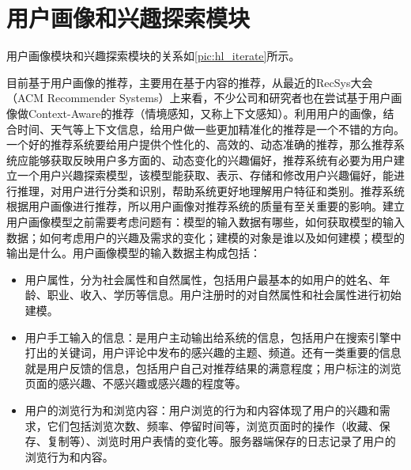   \section{用户画像和兴趣探索模块}
  用户画像模块和兴趣探索模块的关系如\autoref{pic:hl_iterate}所示。
  \begin{figure}
    \centering
      \label{pic:hl_iterate}
  \end{figure}
  目前基于用户画像的推荐，主要用在基于内容的推荐，从最近的RecSys大会（ACM Recommender Systems）上来看，不少公司和研究者也在尝试基于用户画像做Context-Aware的推荐（情境感知，又称上下文感知）。利用用户的画像，结合时间、天气等上下文信息，给用户做一些更加精准化的推荐是一个不错的方向。一个好的推荐系统要给用户提供个性化的、高效的、动态准确的推荐，那么推荐系统应能够获取反映用户多方面的、动态变化的兴趣偏好，推荐系统有必要为用户建立一个用户兴趣探索模型，该模型能获取、表示、存储和修改用户兴趣偏好，能进行推理，对用户进行分类和识别，帮助系统更好地理解用户特征和类别。推荐系统根据用户画像进行推荐，所以用户画像对推荐系统的质量有至关重要的影响。建立用户画像模型之前需要考虑问题有：模型的输入数据有哪些，如何获取模型的输入数据；如何考虑用户的兴趣及需求的变化；建模的对象是谁以及如何建模；模型的输出是什么。用户画像模型的输入数据主构成包括：
  \begin{itemize}
  \item 用户属性，分为社会属性和自然属性，包括用户最基本的如用户的姓名、年龄、职业、收入、学历等信息。用户注册时的对自然属性和社会属性进行初始建模。 
  \item 用户手工输入的信息：是用户主动输出给系统的信息，包括用户在搜索引擎中打出的关键词，用户评论中发布的感兴趣的主题、频道。还有一类重要的信息就是用户反馈的信息，包括用户自己对推荐结果的满意程度；用户标注的浏览页面的感兴趣、不感兴趣或感兴趣的程度等。
  \item 用户的浏览行为和浏览内容：用户浏览的行为和内容体现了用户的兴趣和需求，它们包括浏览次数、频率、停留时间等，浏览页面时的操作（收藏、保存、复制等）、浏览时用户表情的变化等。服务器端保存的日志记录了用户的浏览行为和内容。
  \end{itemize}


